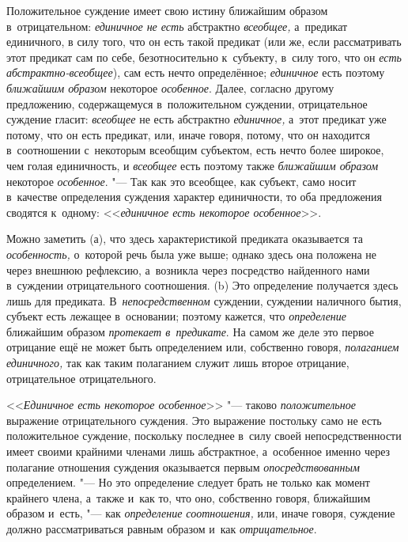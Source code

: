 Положительное суждение имеет свою истину ближайшим образом в~отрицательном:
{\em единичное не есть} абстрактно {\em всеобщее,} а~предикат единичного, в
силу того, что он есть такой предикат (или же, если рассматривать этот предикат
сам по себе, безотносительно к~субъекту, в~силу того, что он
{\em есть абстрактно-всеобщее}), сам есть нечто определённое; {\em единичное}
есть поэтому {\em ближайшим образом} некоторое {\em особенное}. Далее, согласно
другому предложению, содержащемуся в~положительном суждении, отрицательное
суждение гласит: {\em всеобщее} не есть абстрактно {\em единичное,} а~этот
предикат уже потому, что он есть предикат, или, иначе говоря, потому, что он
находится в~соотношении с~некоторым всеобщим субъектом, есть нечто более
широкое, чем голая единичность, и {\em всеобщее} есть поэтому также
{\em ближайшим образом} некоторое {\em особенное}. "--- Так как это всеобщее,
как субъект, само носит в~качестве определения суждения характер единичности,
то оба предложения сводятся к~одному:
<<{\em единичное есть некоторое особенное}>>.

Можно заметить (а), что здесь характеристикой предиката оказывается та
{\em особенность,} о~которой речь была уже выше; однако здесь она положена не через
внешнюю рефлексию, а~возникла через посредство найденного нами в~суждении
отрицательного соотношения. (b) Это определение получается здесь лишь для
предиката. В~{\em непосредственном} суждении, суждении наличного бытия,
субъект есть лежащее в~основании; поэтому кажется, что {\em определение}
ближайшим образом {\em протекает в~предикате}. На самом же деле это первое
отрицание ещё не может быть определением или, собственно говоря,
{\em полаганием единичного,} так как таким полаганием служит лишь второе
отрицание, отрицательное отрицательного.

<<{\em Единичное есть некоторое особенное}>> "--- таково {\em положительное}
выражение отрицательного суждения. Это выражение постольку само не есть
положительное суждение, поскольку последнее в~силу своей непосредственности
имеет своими крайними членами лишь абстрактное, а~особенное именно через
полагание отношения суждения оказывается первым {\em опосредствованным}
определением. "--- Но это определение следует брать не только как момент
крайнего члена, а~также и~как то, что оно, собственно говоря, ближайшим образом
и~есть, "--- как {\em определение соотношения,} или, иначе говоря, суждение
должно рассматриваться равным образом и~как {\em отрицательное}.

